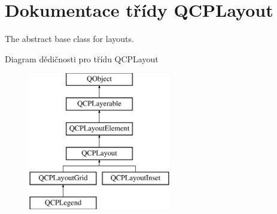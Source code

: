\hypertarget{classQCPLayout}{}\section{Dokumentace třídy Q\+C\+P\+Layout}
\label{classQCPLayout}


The abstract base class for layouts.  


Diagram dědičnosti pro třídu Q\+C\+P\+Layout\begin{figure}[H]
\begin{center}
\leavevmode
\includegraphics[height=6.000000cm]{classQCPLayout}
\end{center}
\end{figure}
